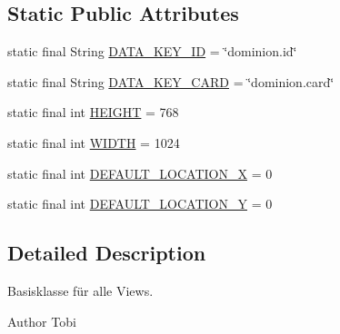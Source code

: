 \subsection*{\-Static \-Public \-Attributes}
\begin{DoxyCompactItemize}
\item 
static final \-String \hyperlink{classdominion_1_1view_1_1DominionShell_af14f58f7caf70ec91889ce707dc32855}{\-D\-A\-T\-A\-\_\-\-K\-E\-Y\-\_\-\-I\-D} = \char`\"{}dominion.\-id\char`\"{}
\item 
static final \-String \hyperlink{classdominion_1_1view_1_1DominionShell_a0a6b77ea71dca4fd5b4fe3a01f1cf477}{\-D\-A\-T\-A\-\_\-\-K\-E\-Y\-\_\-\-C\-A\-R\-D} = \char`\"{}dominion.\-card\char`\"{}
\item 
static final int \hyperlink{classdominion_1_1view_1_1DominionShell_aa7fc5dec92276999412d374265b8c5da}{\-H\-E\-I\-G\-H\-T} = 768
\item 
static final int \hyperlink{classdominion_1_1view_1_1DominionShell_af01ff50efba50286c6685b8848bed064}{\-W\-I\-D\-T\-H} = 1024
\item 
static final int \hyperlink{classdominion_1_1view_1_1DominionShell_a0b1b3d7ddffa519f101d2edab03c5147}{\-D\-E\-F\-A\-U\-L\-T\-\_\-\-L\-O\-C\-A\-T\-I\-O\-N\-\_\-\-X} = 0
\item 
static final int \hyperlink{classdominion_1_1view_1_1DominionShell_a5be8882143216217dc71c9bc628273db}{\-D\-E\-F\-A\-U\-L\-T\-\_\-\-L\-O\-C\-A\-T\-I\-O\-N\-\_\-\-Y} = 0
\end{DoxyCompactItemize}


\subsection{\-Detailed \-Description}
\-Basisklasse für alle \-Views.

\begin{DoxyAuthor}{\-Author}
\-Tobi 
\end{DoxyAuthor}


